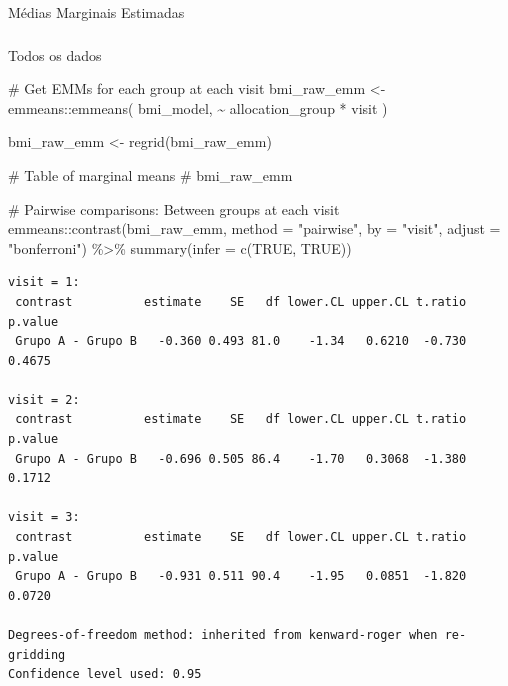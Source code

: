 \documentclass[
  12pt,
]{article}
\makeatletter
\let\oldparagraph\paragraph
\renewcommand{\paragraph}{
    \@ifstar
      \xxxParagraphStar
      \xxxParagraphNoStar
  }
\newcommand{\xxxParagraphStar}[1]{\oldparagraph*{#1}\mbox{}}
\newcommand{\xxxParagraphNoStar}[1]{\oldparagraph{#1}\mbox{}}
\let\oldsubparagraph\subparagraph
\renewcommand{\subparagraph}{
    \@ifstar
      \xxxSubParagraphStar
      \xxxSubParagraphNoStar
  }
\newcommand{\xxxSubParagraphStar}[1]{\oldsubparagraph*{#1}\mbox{}}
\newcommand{\xxxSubParagraphNoStar}[1]{\oldsubparagraph{#1}\mbox{}}
\newenvironment{Shaded}{\begin{snugshade}}{\end{snugshade}}
\newcommand{\AttributeTok}[1]{\textcolor[rgb]{0.40,0.45,0.13}{#1}}
\newcommand{\CommentTok}[1]{\textcolor[rgb]{0.37,0.37,0.37}{#1}}
\newcommand{\ConstantTok}[1]{\textcolor[rgb]{0.56,0.35,0.01}{#1}}
\newcommand{\FunctionTok}[1]{\textcolor[rgb]{0.28,0.35,0.67}{#1}}
\newcommand{\NormalTok}[1]{\textcolor[rgb]{0.00,0.23,0.31}{#1}}
\newcommand{\OtherTok}[1]{\textcolor[rgb]{0.00,0.23,0.31}{#1}}
\newcommand{\SpecialCharTok}[1]{\textcolor[rgb]{0.37,0.37,0.37}{#1}}
\newcommand{\StringTok}[1]{\textcolor[rgb]{0.13,0.47,0.30}{#1}}
\makeatother
\begin{document}
\paragraph{Médias Marginais
Estimadas}\label{muxe9dias-marginais-estimadas-14}

\subparagraph{Todos os dados}\label{todos-os-dados-14}

\begin{Shaded}
\begin{Highlighting}[]
\CommentTok{\# Get EMMs for each group at each visit}
\NormalTok{bmi\_raw\_emm }\OtherTok{\textless{}{-}}\NormalTok{ emmeans}\SpecialCharTok{::}\FunctionTok{emmeans}\NormalTok{(}
\NormalTok{    bmi\_model, }
    \SpecialCharTok{\textasciitilde{}}\NormalTok{ allocation\_group }\SpecialCharTok{*}\NormalTok{ visit}
\NormalTok{)}

\NormalTok{bmi\_raw\_emm }\OtherTok{\textless{}{-}} \FunctionTok{regrid}\NormalTok{(bmi\_raw\_emm)}

\CommentTok{\# Table of marginal means}
\CommentTok{\# bmi\_raw\_emm}

\CommentTok{\# Pairwise comparisons: Between groups at each visit}
\NormalTok{emmeans}\SpecialCharTok{::}\FunctionTok{contrast}\NormalTok{(bmi\_raw\_emm,}
\AttributeTok{method =} \StringTok{"pairwise"}\NormalTok{, }\AttributeTok{by =} \StringTok{"visit"}\NormalTok{,}
\AttributeTok{adjust =} \StringTok{"bonferroni"}\NormalTok{) }\SpecialCharTok{\%\textgreater{}\%} \FunctionTok{summary}\NormalTok{(}\AttributeTok{infer =} \FunctionTok{c}\NormalTok{(}\ConstantTok{TRUE}\NormalTok{, }\ConstantTok{TRUE}\NormalTok{))}
\end{Highlighting}
\end{Shaded}

\begin{verbatim}
visit = 1:
 contrast          estimate    SE   df lower.CL upper.CL t.ratio p.value
 Grupo A - Grupo B   -0.360 0.493 81.0    -1.34   0.6210  -0.730  0.4675

visit = 2:
 contrast          estimate    SE   df lower.CL upper.CL t.ratio p.value
 Grupo A - Grupo B   -0.696 0.505 86.4    -1.70   0.3068  -1.380  0.1712

visit = 3:
 contrast          estimate    SE   df lower.CL upper.CL t.ratio p.value
 Grupo A - Grupo B   -0.931 0.511 90.4    -1.95   0.0851  -1.820  0.0720

Degrees-of-freedom method: inherited from kenward-roger when re-gridding 
Confidence level used: 0.95 
\end{verbatim}
\end{document}
